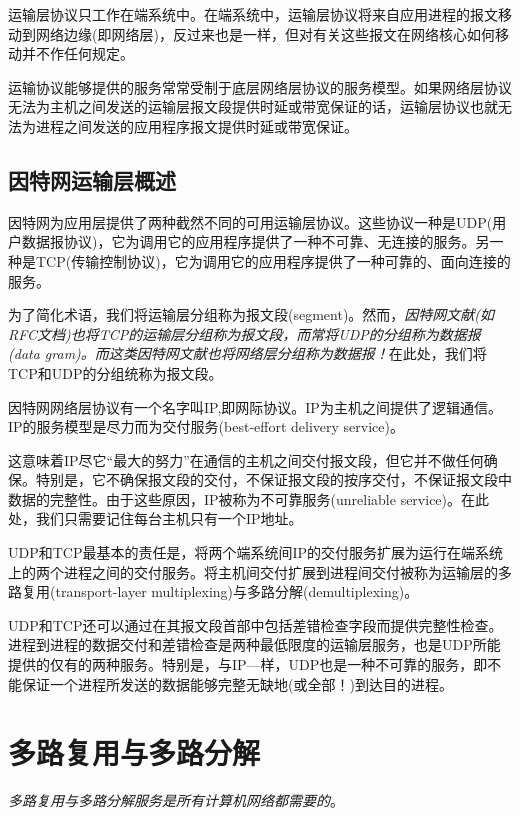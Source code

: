     运输层协议只工作在端系统中。在端系统中，运输层协议将来自应用进程的报文移动到网络边缘(即网络层)，反过来也是一样，但对有关这些报文在网络核心如何移动并不作任何规定。

    运输协议能够提供的服务常常受制于底层网络层协议的服务模型。如果网络层协议无法为主机之间发送的运输层报文段提供时延或带宽保证的话，运输层协议也就无法为进程之间发送的应用程序报文提供时延或带宽保证。

\subsection{因特网运输层概述}

    因特网为应用层提供了两种截然不同的可用运输层协议。这些协议一种是UDP(用户数据报协议)，它为调用它的应用程序提供了一种不可靠、无连接的服务。另一种是TCP(传输控制协议)，它为调用它的应用程序提供了一种可靠的、面向连接的服务。

    为了简化术语，我们将运输层分组称为报文段(segment)。然而，\emph{因特网文献(如RFC文档)也将TCP的运输层分组称为报文段，而常将UDP的分组称为数据报(data gram)。而这类因特网文献也将网络层分组称为数据报！}在此处，我们将TCP和UDP的分组统称为报文段。

    因特网网络层协议有一个名字叫IP,即网际协议。IP为主机之间提供了逻辑通信。IP的服务模型是尽力而为交付服务(best-effort delivery service)。

    这意味着IP尽它“最大的努力”在通信的主机之间交付报文段，但它并不做任何确保。特别是，它不确保报文段的交付，不保证报文段的按序交付，不保证报文段中数据的完整性。由于这些原因，IP被称为不可靠服务(unreliable service)。在此处，我们只需要记住每台主机只有一个IP地址。

    UDP和TCP最基本的责任是，将两个端系统间IP的交付服务扩展为运行在端系统上的两个进程之间的交付服务。将主机间交付扩展到进程间交付被称为运输层的多路复用(transport-layer multiplexing)与多路分解(demultiplexing)。

    UDP和TCP还可以通过在其报文段首部中包括差错检查字段而提供完整性检查。进程到进程的数据交付和差错检查是两种最低限度的运输层服务，也是UDP所能提供的仅有的两种服务。特别是，与IP—样，UDP也是一种不可靠的服务，即不能保证一个进程所发送的数据能够完整无缺地(或全部！)到达目的进程。

\section{多路复用与多路分解}

    \emph{多路复用与多路分解服务是所有计算机网络都需要的}。


